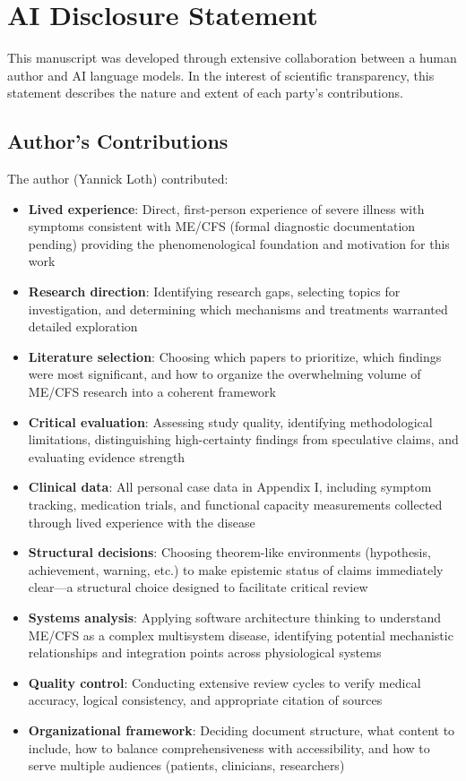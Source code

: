 \chapter*{AI Disclosure Statement}

This manuscript was developed through extensive collaboration between a human author and AI language models. In the interest of scientific transparency, this statement describes the nature and extent of each party's contributions.

\section*{Author's Contributions}

The author (Yannick Loth) contributed:

\begin{itemize}
    \item \textbf{Lived experience}: Direct, first-person experience of severe illness with symptoms consistent with ME/CFS (formal diagnostic documentation pending) providing the phenomenological foundation and motivation for this work
    \item \textbf{Research direction}: Identifying research gaps, selecting topics for investigation, and determining which mechanisms and treatments warranted detailed exploration
    \item \textbf{Literature selection}: Choosing which papers to prioritize, which findings were most significant, and how to organize the overwhelming volume of ME/CFS research into a coherent framework
    \item \textbf{Critical evaluation}: Assessing study quality, identifying methodological limitations, distinguishing high-certainty findings from speculative claims, and evaluating evidence strength
    \item \textbf{Clinical data}: All personal case data in Appendix I, including symptom tracking, medication trials, and functional capacity measurements collected through lived experience with the disease
    \item \textbf{Structural decisions}: Choosing theorem-like environments (hypothesis, achievement, warning, etc.) to make epistemic status of claims immediately clear---a structural choice designed to facilitate critical review
    \item \textbf{Systems analysis}: Applying software architecture thinking to understand ME/CFS as a complex multisystem disease, identifying potential mechanistic relationships and integration points across physiological systems
    \item \textbf{Quality control}: Conducting extensive review cycles to verify medical accuracy, logical consistency, and appropriate citation of sources
    \item \textbf{Organizational framework}: Deciding document structure, what content to include, how to balance comprehensiveness with accessibility, and how to serve multiple audiences (patients, clinicians, researchers)
\end{itemize}

